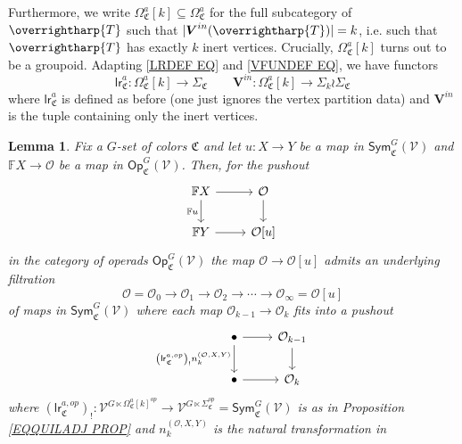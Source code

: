\documentclass[a4paper,10pt
,draft
]{article}%
\numberwithin{equation}{section}
\numberwithin{figure}{section}
\newtheorem{lemma}[equation]{Lemma}%
\theoremstyle{definition} %
\newcommand{\vect}[1]{\text{\overrightharp{\ensuremath{#1}}}}
\newcommand{\V}{\ensuremath{\mathcal V}}
\renewcommand{\O}{\ensuremath{\mathcal O}}
\newcommand{\1}{\ensuremath{\mathbbm 1}}%
\begin{document}
Furthermore, we write
$\Omega_{\mathfrak C}^a[k] \subseteq \Omega_{\mathfrak C}^a$
for the full subcategory of $\vect{T}$ such that 
$|\boldsymbol{V}^{in}(\vect{T})| = k$,
i.e. such that $\vect{T}$ has exactly $k$ inert vertices.
Crucially, $\Omega^a_{\mathfrak{C}}[k]$
turns out to be a groupoid.
%
Adapting \eqref{LRDEF EQ} and \eqref{VFUNDEF EQ}, 
we have functors
\[
\mathsf{lr}_{\mathfrak C}^{a} \colon
\Omega^a_{\mathfrak{C}}[k]
\to
\Sigma_{\mathfrak{C}}
	\qquad
\boldsymbol{V}^{in} \colon
\Omega^a_{\mathfrak{C}}[k]
\to
\Sigma_k \wr \Sigma_{\mathfrak{C}}
\]
where $\mathsf{lr}_{\mathfrak C}^{a}$ is defined as before (one just ignores the vertex partition data)
and $\boldsymbol{V}^{in}$ is the tuple containing only the inert vertices.



\begin{lemma}\label{OURE LEM}
Fix a $G$-set of colors $\mathfrak{C}$ and let
$u\colon X \to Y$ be a map in $\mathsf{Sym}^G_{\mathfrak{C}}(\V)$
and
$\mathbb{F} X \to \O$ be a map in $\mathsf{Op}^G_{\mathfrak{C}}(\V)$.
Then, for the pushout 
\begin{equation}\label{OURE EQ}
\begin{tikzcd}
	\mathbb F X \arrow[d, "\mathbb{F}u"'] \arrow[r]
&
	\O \arrow[d]
\\
	\mathbb F Y \arrow[r]
&
\O[u]
\end{tikzcd}
\end{equation}
in the category of operads $\mathsf{Op}^G_{\mathfrak{C}}(\V)$
the map $\O \to \O[u]$ admits an underlying filtration
\begin{equation}\label{OUFILRE EQ}
\O = \O_0 \to \O_1 \to \O_2 \to \cdots \to \O_{\infty} = \O[u]
\end{equation}
of maps in $\mathsf{Sym}^G_{\mathfrak{C}}(\V)$ 
where each map $\O_{k-1} \to \O_k$ fits into a pushout
\begin{equation}\label{OUPUSHRE EQ}
\begin{tikzcd}
	\bullet 
	\arrow{d}[swap]{\left(\mathsf{lr}_{\mathfrak C}^{a,op}\right)_!
	n_k^{(\O,X,Y)}}
	 \arrow[r]
&
	\O_{k-1} \arrow[d]
\\
	\bullet \arrow[r]
&
	\O_k
\end{tikzcd}
\end{equation}
where 
$
\left(\mathsf{lr}_{\mathfrak C}^{a,op}\right)_! \colon
\mathcal{V}^{G \ltimes \Omega^a_{\mathfrak{C}}[k]^{op}}
\to
\mathcal{V}^{G \ltimes \Sigma_{\mathfrak{C}}^{op}}
=
\mathsf{Sym}^G_{\mathfrak{C}}(\V)
$
is as in Proposition \ref{EQQUILADJ PROP}
and $n_k^{(\O,X,Y)}$ is the natural transformation in 

\end{lemma}
\end{document}
